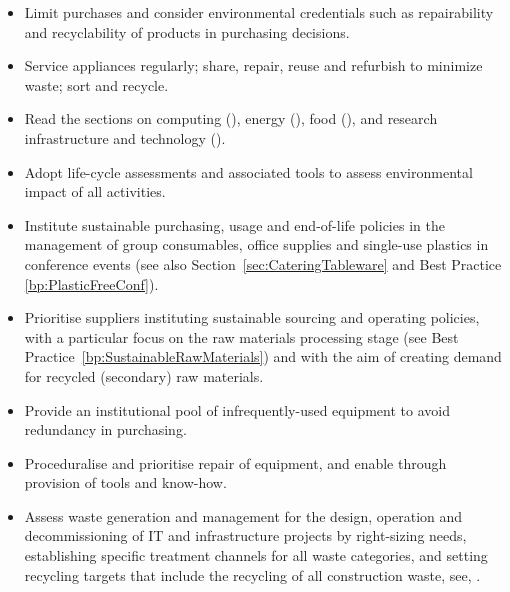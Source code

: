 \documentclass[../SustainableHEP.tex]{subfiles}
\begin{document}
\clearpage
\begin{reco2}{\currentname}
{
\begin{itemize}[leftmargin=3.5 mm]
\item Limit purchases and consider environmental credentials such as repairability and recyclability of products in purchasing decisions.

\item Service appliances regularly; share, repair, reuse and refurbish to minimize waste; sort and recycle.

\item Read the sections on computing (), energy (), food (), and research infrastructure and technology ().
\end{itemize}
}
{\begin{itemize}[leftmargin=3.5 mm]
\item Adopt life-cycle assessments and associated tools to assess environmental impact of all activities.

\item Institute sustainable purchasing, usage and end-of-life policies in the management of group consumables,  office supplies and single-use plastics \eg in conference events (see also Section~\ref{sec:CateringTableware} and Best Practice \ref{bp:PlasticFreeConf}).
\end{itemize}
}
{
\begin{itemize}[leftmargin=3.5 mm]

\item Prioritise suppliers instituting sustainable sourcing and operating policies, with a particular focus on the raw materials processing stage (see Best Practice~\ref{bp:SustainableRawMaterials}) and with the aim of creating demand for recycled (secondary) raw materials.

\item Provide an institutional pool of infrequently-used equipment to avoid redundancy in purchasing.

\item Proceduralise and prioritise repair of equipment, and enable through provision of tools and know-how.

\item Assess waste generation and management for the design, operation and decommissioning of IT and infrastructure projects by right-sizing needs, establishing specific treatment channels for all waste categories, and setting recycling targets that include the recycling of all construction waste, see, \eg {}.

\end{itemize}
}
\end{reco2}
\end{document}
